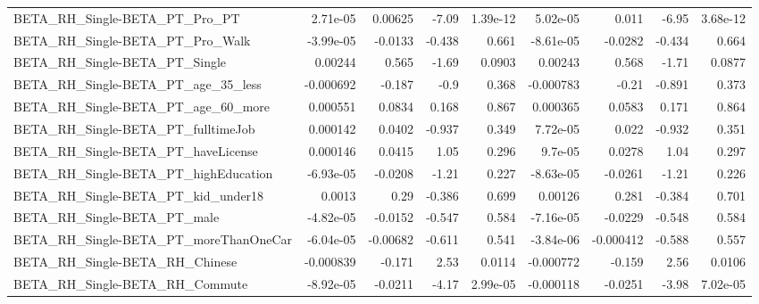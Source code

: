 \begin{tabular}{lrrrrrrrr}
BETA\_RH\_Single-BETA\_PT\_Pro\_PT                      &    2.71e-05 &      0.00625 &    -7.09 & 1.39e-12 &   5.02e-05 &       0.011 &        -6.95 &      3.68e-12 \\
BETA\_RH\_Single-BETA\_PT\_Pro\_Walk                    &   -3.99e-05 &      -0.0133 &   -0.438 &    0.661 &  -8.61e-05 &     -0.0282 &       -0.434 &         0.664 \\
BETA\_RH\_Single-BETA\_PT\_Single                      &     0.00244 &        0.565 &    -1.69 &   0.0903 &    0.00243 &       0.568 &        -1.71 &        0.0877 \\
BETA\_RH\_Single-BETA\_PT\_age\_35\_less                 &   -0.000692 &       -0.187 &     -0.9 &    0.368 &  -0.000783 &       -0.21 &       -0.891 &         0.373 \\
BETA\_RH\_Single-BETA\_PT\_age\_60\_more                 &    0.000551 &       0.0834 &    0.168 &    0.867 &   0.000365 &      0.0583 &        0.171 &         0.864 \\
BETA\_RH\_Single-BETA\_PT\_fulltimeJob                 &    0.000142 &       0.0402 &   -0.937 &    0.349 &   7.72e-05 &       0.022 &       -0.932 &         0.351 \\
BETA\_RH\_Single-BETA\_PT\_haveLicense                 &    0.000146 &       0.0415 &     1.05 &    0.296 &    9.7e-05 &      0.0278 &         1.04 &         0.297 \\
BETA\_RH\_Single-BETA\_PT\_highEducation               &   -6.93e-05 &      -0.0208 &    -1.21 &    0.227 &  -8.63e-05 &     -0.0261 &        -1.21 &         0.226 \\
BETA\_RH\_Single-BETA\_PT\_kid\_under18                 &      0.0013 &         0.29 &   -0.386 &    0.699 &    0.00126 &       0.281 &       -0.384 &         0.701 \\
BETA\_RH\_Single-BETA\_PT\_male                        &   -4.82e-05 &      -0.0152 &   -0.547 &    0.584 &  -7.16e-05 &     -0.0229 &       -0.548 &         0.584 \\
BETA\_RH\_Single-BETA\_PT\_moreThanOneCar              &   -6.04e-05 &     -0.00682 &   -0.611 &    0.541 &  -3.84e-06 &   -0.000412 &       -0.588 &         0.557 \\
BETA\_RH\_Single-BETA\_RH\_Chinese                     &   -0.000839 &       -0.171 &     2.53 &   0.0114 &  -0.000772 &      -0.159 &         2.56 &        0.0106 \\
BETA\_RH\_Single-BETA\_RH\_Commute                     &   -8.92e-05 &      -0.0211 &    -4.17 & 2.99e-05 &  -0.000118 &     -0.0251 &        -3.98 &      7.02e-05 \\

\end{tabular}
